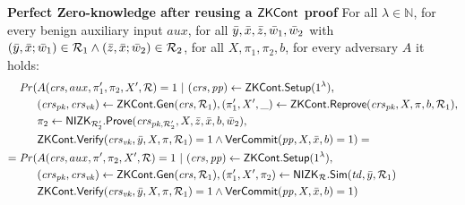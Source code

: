 \noindent \textbf{Perfect Zero-knowledge after reusing a $\ZKCont$ proof} For all $\lambda \in \mathbb{N}$, for every benign auxiliary input $aux$, 
for all $\bary,\barx,\barz, \baromega_1, \baromega_2$ with $(\bary, \barx; \baromega_1) \in \relone \wedge (\barz, \barx; \baromega_2) \in \reltwo$, for all $X,\pi_1,\pi_2, b$, for every adversary $A$ it holds:
\begin{align*}
\mathit{Pr}(& A(\crs, aux, \pi'_1,\pi_2, X', \rel) = 1 \ | \ (\crs, \pp) \leftarrow \ZKCont.\Setup (1^{\lambda}), \\
                  & (\crspk, \crsvk) \leftarrow \ZKCont.\Gen(\crs, \relone), (\pi'_1, X', \_) \leftarrow \ZKCont.\Reprove (\crspk, X, \pi, b, \relone), \\
                  & \pi_2 \leftarrow \nizktwo.\Prove(\crspktwo, X, \barz, \barx, b, \baromega_2), \\
                  &  \ZKCont.\Verify(\crsvk, \bary, X, \pi, \relone) = 1 
                  \wedge \VerifyCom(\pp, X, \bar{x}, b) = 1) =  \\
= \mathit{Pr}(& A(\crs, aux, \pi',\pi_2, X', \rel) = 1 \ | \ (\crs, \pp) \leftarrow \ZKCont.\Setup (1^{\lambda}), \\ 
                     & (\crspk, \crsvk) \leftarrow \ZKCont.\Gen(\crs, \relone), (\pi'_1, X',\pi_2) \leftarrow \nizkR.\Sim(\tw, \bary, \relone) \\ 
                     &  \ZKCont.\Verify(\crsvk, \bary, X, \pi, \relone) = 1
                    \wedge \VerifyCom(\pp, X, \bar{x}, b) = 1)
\end{align*}

